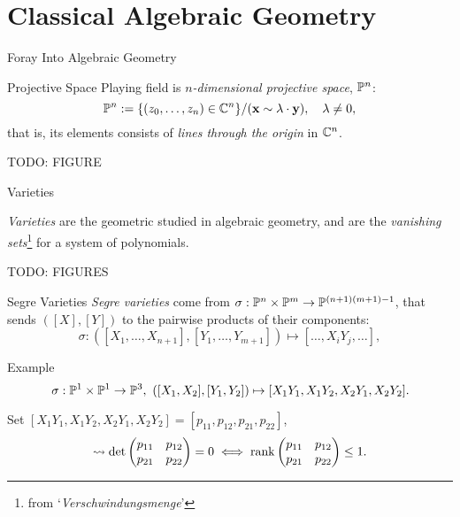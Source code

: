 \section{Classical Algebraic Geometry}

\begin{frame}{Foray Into Algebraic Geometry}
    \begin{block}{Projective Space}
    Playing field is $n$\emph{-dimensional projective space}, $\mathbb{P}^{n}$:
        $$ \mathbb{P}^{n} := \{ (z_{0}, \ldots, z_{n}) \in \mathbb{C}^{n} \} / (\vb{x} \sim \lambda \cdot \vb{y}), \quad \lambda \neq 0, $$
    that is, its elements consists of \emph{lines through the origin} in $\mathbb{C}^{n}$.
    \end{block}
    
    TODO: FIGURE
\end{frame}

\begin{frame}{Varieties}
    
    \emph{Varieties} are the geometric studied in algebraic geometry, and are the \emph{vanishing sets}\footnote{from `\emph{Verschwindungsmenge}'} for a system of polynomials.

    TODO: FIGURES

\end{frame}

\begin{frame}{Segre Varieties}
        \emph{Segre varieties} come from $\sigma: \mathbb{P}^{n} \times \mathbb{P}^{m} \rightarrow \mathbb{P}^{(n+1)(m+1) - 1}$, that sends $([X],[Y])$ to the pairwise products of their components:
            $$ \sigma : ([X_{1}, \ldots, X_{n+1}], [Y_{1}, \ldots, Y_{m+1}]) \mapsto [\ldots, X_{i}Y_{j}, \ldots ], $$

        \begin{block}{Example}
        $$\sigma : \mathbb{P}^{1} \times \mathbb{P}^{1} \rightarrow \mathbb{P}^{3},\ ([X_{1}, X_{2}], [Y_{1}, Y_{2}]) \mapsto [ X_{1}Y_{1}, X_{1}Y_{2}, X_{2}Y_{1}, X_{2}Y_{2} ].  $$
        
        Set $[ X_{1}Y_{1}, X_{1}Y_{2}, X_{2}Y_{1}, X_{2}Y_{2} ] = [p_{11}, p_{12}, p_{21}, p_{22}]$,
        $$ \rightsquigarrow \det \begin{pmatrix} p_{11} & p_{12} \\ p_{21} & p_{22} \end{pmatrix} = 0 \iff \rank \begin{pmatrix} p_{11} & p_{12} \\ p_{21} & p_{22} \end{pmatrix} \leq 1. $$
        \end{block}
\end{frame}


